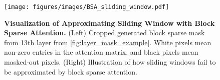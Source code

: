 \begin{figure}[htbp]
\centering
\texttt{[image: figures/images/BSA\_sliding\_window.pdf]}
\caption{\textbf{Visualization of Approximating Sliding Window with Block Sparse Attention.} (Left) Cropped generated block sparse mask from 13th layer from \cref{fig:layer_mask_example}. White pixels mean non-zero entries in the attention matrix, and black pixels mean masked-out pixels. (Right) Illustration of how sliding windows fail to be approximated by block sparse attention.}
\label{fig:appendix_bsa_sw}
\end{figure}